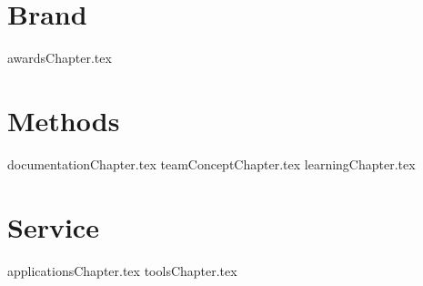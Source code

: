 \documentclass[letterpaper, 12pt]{memoir}  %
\begin{document}
\frontmatter %
\pagestyle{plain} %
\begin{titlingpage}
\titleM  %
\end{titlingpage}
\setmarginnotes{.1in}{.4in}{.1in}
\setulmarginsandblock{1in}{1in}{*}
\checkandfixthelayout
\makeatletter
\ch@ngetext
\makeatother
\tableofcontents %
\mainmatter %
\pagestyle{jalapenoPageStyleA} %
\part{Brand}
{awardsChapter.tex}
\part{Methods}
{documentationChapter.tex}
{teamConceptChapter.tex}
%
{learningChapter.tex}
%
\part{Service}

{applicationsChapter.tex}
%
{toolsChapter.tex}
\end{document}
